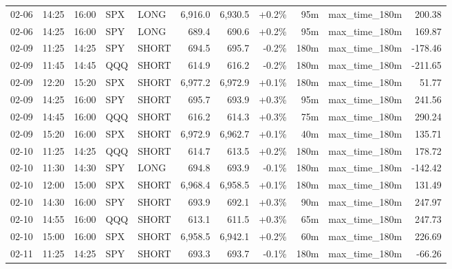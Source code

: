 \documentclass[11pt,a4paper,twoside]{article}
\begin{document}
\begin{center}
\begin{longtable}{>{\color{txtmain}}l l l l l r r r r >{\color{txtmain}}l r}
02-06 & 14:25 & 16:00 & SPX & LONG & 6,916.0 & 6,930.5 & \textcolor{wingreen}{+0.2\%} & 95m & max\_time\_180m & \textcolor{wingreen}{200.38} \\
02-06 & 14:25 & 16:00 & SPY & LONG & 689.4 & 690.6 & \textcolor{wingreen}{+0.2\%} & 95m & max\_time\_180m & \textcolor{wingreen}{169.87} \\
02-09 & 11:25 & 14:25 & SPY & SHORT & 694.5 & 695.7 & \textcolor{lossred}{-0.2\%} & 180m & max\_time\_180m & \textcolor{lossred}{-178.46} \\
02-09 & 11:45 & 14:45 & QQQ & SHORT & 614.9 & 616.2 & \textcolor{lossred}{-0.2\%} & 180m & max\_time\_180m & \textcolor{lossred}{-211.65} \\
02-09 & 12:20 & 15:20 & SPX & SHORT & 6,977.2 & 6,972.9 & \textcolor{wingreen}{+0.1\%} & 180m & max\_time\_180m & \textcolor{wingreen}{51.77} \\
02-09 & 14:25 & 16:00 & SPY & SHORT & 695.7 & 693.9 & \textcolor{wingreen}{+0.3\%} & 95m & max\_time\_180m & \textcolor{wingreen}{241.56} \\
02-09 & 14:45 & 16:00 & QQQ & SHORT & 616.2 & 614.3 & \textcolor{wingreen}{+0.3\%} & 75m & max\_time\_180m & \textcolor{wingreen}{290.24} \\
02-09 & 15:20 & 16:00 & SPX & SHORT & 6,972.9 & 6,962.7 & \textcolor{wingreen}{+0.1\%} & 40m & max\_time\_180m & \textcolor{wingreen}{135.71} \\
02-10 & 11:25 & 14:25 & QQQ & SHORT & 614.7 & 613.5 & \textcolor{wingreen}{+0.2\%} & 180m & max\_time\_180m & \textcolor{wingreen}{178.72} \\
02-10 & 11:30 & 14:30 & SPY & LONG & 694.8 & 693.9 & \textcolor{lossred}{-0.1\%} & 180m & max\_time\_180m & \textcolor{lossred}{-142.42} \\
02-10 & 12:00 & 15:00 & SPX & SHORT & 6,968.4 & 6,958.5 & \textcolor{wingreen}{+0.1\%} & 180m & max\_time\_180m & \textcolor{wingreen}{131.49} \\
02-10 & 14:30 & 16:00 & SPY & SHORT & 693.9 & 692.1 & \textcolor{wingreen}{+0.3\%} & 90m & max\_time\_180m & \textcolor{wingreen}{247.97} \\
02-10 & 14:55 & 16:00 & QQQ & SHORT & 613.1 & 611.5 & \textcolor{wingreen}{+0.3\%} & 65m & max\_time\_180m & \textcolor{wingreen}{247.73} \\
02-10 & 15:00 & 16:00 & SPX & SHORT & 6,958.5 & 6,942.1 & \textcolor{wingreen}{+0.2\%} & 60m & max\_time\_180m & \textcolor{wingreen}{226.69} \\
02-11 & 11:25 & 14:25 & SPY & SHORT & 693.3 & 693.7 & \textcolor{lossred}{-0.1\%} & 180m & max\_time\_180m & \textcolor{lossred}{-66.26} \\

\end{longtable}
\end{center}
\end{document}
